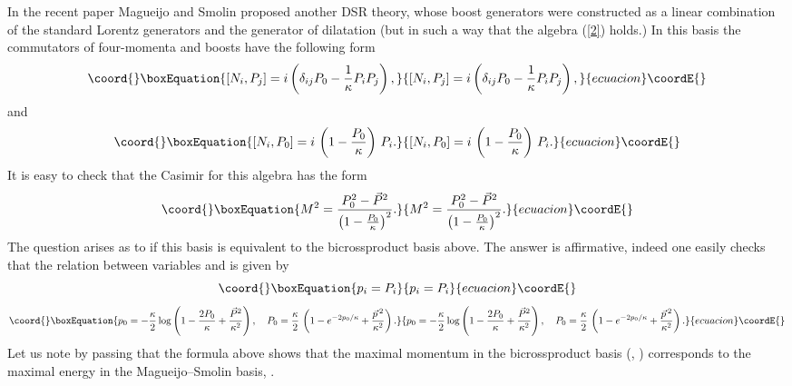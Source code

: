 \documentclass[a4paper,a4paper]{article}
\begin{document}
In the recent paper \cite{JoaoLee} Magueijo and Smolin proposed
another DSR theory, whose boost  generators were constructed as a
linear combination of the standard Lorentz generators and the
generator of dilatation (but in such a way that the algebra
(\ref{2}) holds.) In this basis the commutators of four-momenta
\coordHE{} and boosts have the following form
\begin{equation}\coord{}\boxEquation{\label{7}
   \left[N_{i}, P_{j}\right] =  i\left( \delta_{ij}P_0 -
  {1\over \kappa} P_{i}P_{j} \right),
}{\left[N_{i}, P_{j}\right] =  i\left( \delta_{ij}P_0 -
  {1\over \kappa} P_{i}P_{j} \right),
}{ecuacion}\coordE{}\end{equation}
and
\begin{equation}\coord{}\boxEquation{\label{8}
  \left[N_{i},P_{0}\right] = i\, \left( 1 - {P_0\over \kappa}\right)\,P_{i}.
}{\left[N_{i},P_{0}\right] = i\, \left( 1 - {P_0\over \kappa}\right)\,P_{i}.
}{ecuacion}\coordE{}\end{equation}
It is easy to check that the Casimir for this algebra has the form
\begin{equation}\coord{}\boxEquation{\label{9}
 M^2 = \frac{P_{0}^2 - \vec{P}{}^2}{\left(1- \frac{P_0}\kappa\right)^2}.
}{M^2 = \frac{P_{0}^2 - \vec{P}{}^2}{\left(1- \frac{P_0}\kappa\right)^2}.
}{ecuacion}\coordE{}\end{equation}
The question arises as to if this basis is equivalent to the
bicrossproduct basis above. The answer is  affirmative, indeed one
easily checks that the relation between variables \coordHE{} and
\coordHE{} is given by
\begin{equation}\coord{}\boxEquation{\label{10}
p_{i} = P_{i}
}{p_{i} = P_{i}
}{ecuacion}\coordE{}\end{equation}
\begin{equation}\coord{}\boxEquation{\label{11}
p_0 = - \frac\kappa2\log\left(1 - \frac{2P_0}{\kappa} + \frac{\vec{P}{}^2}{\kappa^2}\right),
\quad  P_0 = \frac\kappa2\,\left(1 -  e^{-2p_0/\kappa} + \frac{\vec{p}\,{}^2}{\kappa^2}\right).
}{p_0 = - \frac\kappa2\log\left(1 - \frac{2P_0}{\kappa} + \frac{\vec{P}{}^2}{\kappa^2}\right),
\quad  P_0 = \frac\kappa2\,\left(1 -  e^{-2p_0/\kappa} + \frac{\vec{p}\,{}^2}{\kappa^2}\right).
}{ecuacion}\coordE{}\end{equation}
Let us note by passing that  the  formula above shows that the
maximal momentum in the bicrossproduct basis  (\coordHE{}, \coordHE{}) corresponds to the maximal energy in the
Magueijo--Smolin basis, \coordHE{}.
\end{document}
